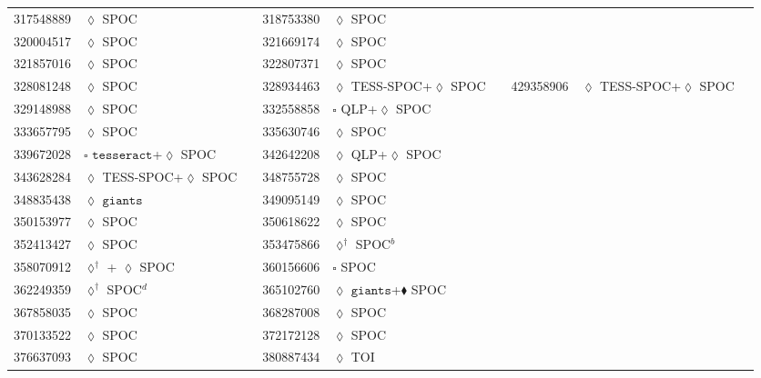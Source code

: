 \begin{longtable}{llrllr}
317548889 & $\lozenge$ SPOC & \cite{TIC_232540264} & 318753380 & $\lozenge$ SPOC & \cite{TIC_428699140} \\
320004517 & $\lozenge$ SPOC & \cite{TIC_320004517} & 321669174 & $\lozenge$ SPOC & \cite{TIC_126606859} \\
321857016 & $\lozenge$ SPOC & \cite{TIC_321857016} & 322807371 & $\lozenge$ SPOC & \cite{TIC_322807371} \\
328081248 & $\lozenge$ SPOC & \cite{TIC_159418353} & 328934463 & $\lozenge$ TESS-SPOC+$\lozenge$ SPOC& \cite{TIC_268532343} & 429358906 & $\lozenge$ TESS-SPOC+$\lozenge$ SPOC & \cite{TIC_343628284} \\
329148988 & $\lozenge$ SPOC & \cite{TIC_329148988} & 332558858 & $\square$ QLP+$\lozenge$ SPOC & \cite{TIC_332558858} \\
333657795 & $\lozenge$ SPOC & \cite{TIC_333657795} & 335630746 & $\lozenge$ SPOC & \cite{TIC_335630746} \\
339672028 & $\square$ $\texttt{tesseract}$+$\lozenge$ SPOC & \cite{TIC_66561343} & 342642208 & $\lozenge$ QLP+$\lozenge$ SPOC & \cite{TIC_393831507} \\
343628284 & $\lozenge$ TESS-SPOC+$\lozenge$ SPOC & \cite{TIC_343628284} & 348755728 & $\lozenge$ SPOC & \cite{TIC_348755728} \\
348835438 & $\lozenge$ $\texttt{giants}$ & \cite{TIC_348835438} & 349095149 & $\lozenge$ SPOC & \cite{TIC_349095149} \\
350153977 & $\lozenge$ SPOC & \cite{TIC_350153977} & 350618622 & $\lozenge$ SPOC & \cite{TIC_350618622} \\
352413427 & $\lozenge$ SPOC & \cite{TIC_232540264} & 353475866 & $\lozenge^\dagger$ SPOC$^b$ & \cite{TIC_10837041} \\
358070912 & $\lozenge^\dagger$ + $\lozenge$ SPOC & \cite{TIC_358070912} & 360156606 & $\square$ SPOC & \cite{TIC_360156606} \\
362249359 & $\lozenge^\dagger$ SPOC$^d$ & \cite{TIC_10837041} & 365102760 & $\lozenge$ $\texttt{giants}$+$\blacklozenge$ SPOC & \cite{TIC_365102760} \\
367858035 & $\lozenge$ SPOC & \cite{TIC_232540264} & 368287008 & $\lozenge$ SPOC & \cite{TIC_368287008} \\
370133522 & $\lozenge$ SPOC & \cite{TIC_103633434} & 372172128 & $\lozenge$ SPOC & \cite{TIC_372172128} \\
376637093 & $\lozenge$ SPOC & \cite{TIC_376637093} & 380887434 & $\lozenge$ TOI & \cite{TIC_154872375} \\

\end{longtable}
